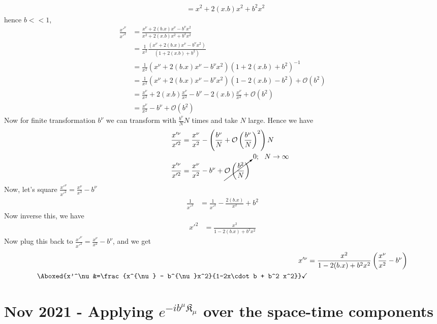\documentclass[]{article}
\numberwithin{equation}{section}
\begin{document}
{{\begin{align}
    &=x^2+2(x.b)x^2+b^2x^2
\end{align}
hence $b<<1$,
\begin{align}
    \frac{x'^\nu}{x'^2}&=\frac{{x}^{{\nu}} + 2(b.x)x^{{\nu}}-b^{\nu}x^2}{x^2+2(x.b)x^2+b^2x^2}\\
    &=\frac{1}{x^2}\frac{({x}^{{\nu}} + 2(b.x)x^{{\nu}}-b^{\nu}x^2)}{(1+2(x.b)+b^2)}\\
    &=\frac{1}{x^2}({x}^{{\nu}} + 2(b.x)x^{{\nu}}-b^{\nu}x^2)(1+2(x.b)+b^2)^{-1}\\
    &=\frac{1}{x^2}({x}^{{\nu}} + 2(b.x)x^{{\nu}}-b^{\nu}x^2)(1-2(x.b)-b^2)+\mathcal{O}({b^2})\\
    &=\frac{x^\nu}{x^2}+2(x.b)\frac{x^\nu}{x^2}-b^\nu-2(x.b)\frac{x^\nu}{x^2}+\mathcal{O}({b^2})\\
    &=\frac{x^\nu}{x^2}-b^\nu+\mathcal{O}({b^2})
\end{align}
Now for finite transformation $b^\nu$ we can transform with $\frac{b^\nu}{N}N$ times and take $N$ large.  Hence we have
\begin{align}
    \frac{x'^\nu}{x'^2}&=\frac{x^\nu}{x^2}-\left(\frac{b^\nu}{N}+\mathcal{O}\left({\frac{b^\nu}{N}}\right)^2\right)N\\
    \frac{x'^\nu}{x'^2}&=\frac{x^\nu}{x^2}-b^\nu+\cancelto{0;~~N\to\infty}{\mathcal{O}\left({\frac{b^2}{N}}\right)}
\end{align}
Now, let's square $\frac{x'^\nu}{x'^2}=\frac{x^\nu}{x^2}-b^\nu$
\begin{align}
    \frac{1}{x'^2}&=\frac{1}{x'^2}-\frac{2(b.x)}{x^2}+b^2
\end{align}
Now inverse this, we have
\begin{align}
    x'^2&=\frac{x^2}{1-2(b.x)+b^2x^2}
\end{align}
Now plug this back to $\frac{x'^\nu}{x'^2}=\frac{x^\nu}{x^2}-b^\nu$, and we get
\begin{align}
    x'^\nu&=\frac{x^2}{1-2(b.x)+b^2x^2}\left(\frac{x^\nu}{x^2}-b^\nu\right)\\
    \Aboxed{x'^\nu&=\frac{x^{\nu} - b^{\nu}x^2}{1-2x\cdot b + b^2 x^2}}\checkmark
\end{align}


% 

\section{Nov 2021 - Applying $e^{-ib^{\mu} \mathfrak{K}_{\mu}}$ over the space-time components}

}}
\end{document}
